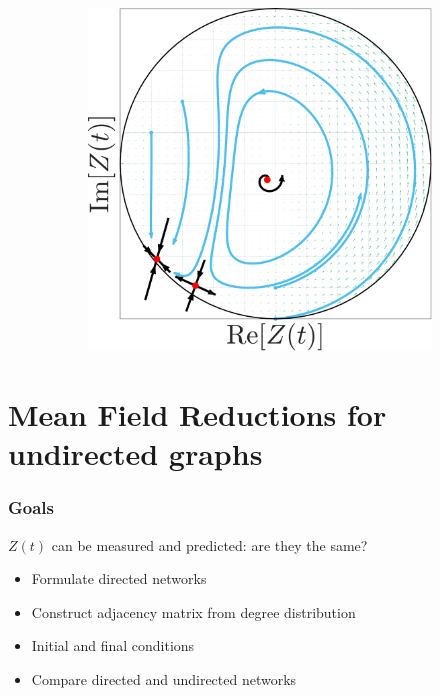 \begin{frame}
\begin{figure}[H]
\begin{subfigure}[b]{0.32\linewidth}
   \label{fig:MFRPSS}
\end{subfigure} \hfill
\begin{subfigure}[b]{0.32\linewidth}
   \centering
  \includegraphics[width=\linewidth]{../Figures/PhaseSpace/MFRCPW.pdf}
   \label{fig:MFRCPW}
\end{subfigure}
   \label{fig:macroscopicstatesfixeddegree}
\end{figure}
\end{frame}

\section{\mywork Mean Field Reductions for undirected graphs} 
\begin{frame}
\frametitle{Goals} 
$Z(t)$ can be measured and predicted: are they the same? \\
\begin{itemize}
\item Formulate directed networks \\
\item Construct adjacency matrix from degree distribution \\
\item Initial and final conditions 
\item Compare directed and undirected networks
\end{itemize}
\end{frame}

